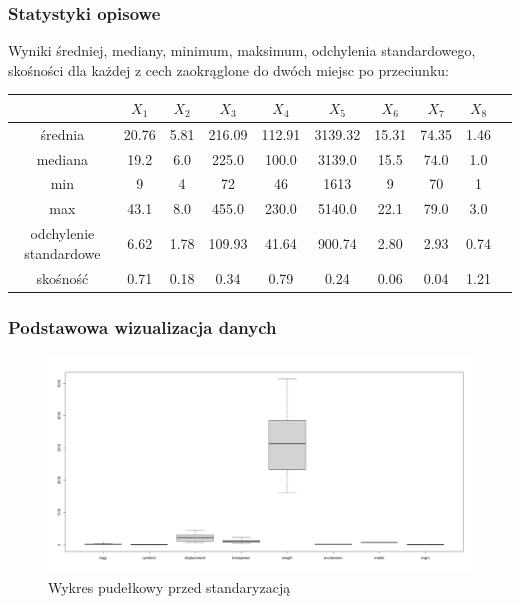 \documentclass{article}
\begin{document}
        \subsubsection*{Statystyki opisowe}
        Wyniki średniej, mediany, minimum, maksimum, odchylenia standardowego, skośności dla każdej z cech zaokrąglone do dwóch 
        miejsc po przeciunku:
        \begin{center}
            \begin{tabular}{ |c|c|c|c|c|c|c|c|c|c| } 
                \hline
                & ${X_1}$ & ${X_2}$ & ${X_3}$ & ${X_4}$ & ${X_5}$ & ${X_6}$ & ${X_7}$ & ${X_8}$ \\
                \hline
                średnia & 20.76  & 5.81 & 216.09 & 112.91 & 3139.32 & 15.31 & 74.35 & 1.46 \\
                \hline
                mediana & 19.2 & 6.0 & 225.0 & 100.0 & 3139.0 & 15.5 & 74.0 & 1.0 \\
                \hline
                min & 9 & 4 & 72 & 46 & 1613 & 9 & 70 & 1  \\
                \hline
                max & 43.1 & 8.0 & 455.0 & 230.0 & 5140.0 & 22.1 & 79.0 &  3.0  \\
                \hline
                odchylenie standardowe & 6.62 & 1.78 & 109.93 & 41.64 & 900.74 & 2.80 & 2.93 &  0.74  \\
                \hline
                skośność & 0.71 & 0.18 & 0.34 & 0.79 & 0.24 & 0.06 & 0.04 &  1.21 \\
                \hline
            \end{tabular}
        \end{center}
        \subsubsection*{Podstawowa wizualizacja danych}
            \begin{figure}[H]
                \caption{Wykres pudełkowy przed standaryzacją}
                \centering
                \includegraphics[width=\textwidth]{../boxplots/boxplot_noscale_fig.jpeg}
            \end{figure}
\end{document}
